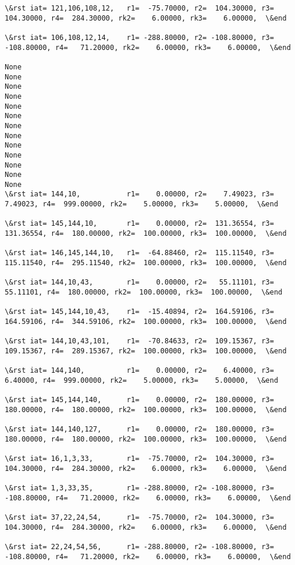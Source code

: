 \documentclass[11pt]{article}
\begin{document}
\begin{Verbatim}[commandchars=\\\{\}]
\&rst iat= 121,106,108,12,   r1=  -75.70000, r2=  104.30000, r3=  104.30000, r4=  284.30000, rk2=    6.00000, rk3=    6.00000,  \&end

\&rst iat= 106,108,12,14,    r1= -288.80000, r2= -108.80000, r3= -108.80000, r4=   71.20000, rk2=    6.00000, rk3=    6.00000,  \&end

None
None
None
None
None
None
None
None
None
None
None
None
None
\&rst iat= 144,10,           r1=    0.00000, r2=    7.49023, r3=    7.49023, r4=  999.00000, rk2=    5.00000, rk3=    5.00000,  \&end

\&rst iat= 145,144,10,       r1=    0.00000, r2=  131.36554, r3=  131.36554, r4=  180.00000, rk2=  100.00000, rk3=  100.00000,  \&end

\&rst iat= 146,145,144,10,   r1=  -64.88460, r2=  115.11540, r3=  115.11540, r4=  295.11540, rk2=  100.00000, rk3=  100.00000,  \&end

\&rst iat= 144,10,43,        r1=    0.00000, r2=   55.11101, r3=   55.11101, r4=  180.00000, rk2=  100.00000, rk3=  100.00000,  \&end

\&rst iat= 145,144,10,43,    r1=  -15.40894, r2=  164.59106, r3=  164.59106, r4=  344.59106, rk2=  100.00000, rk3=  100.00000,  \&end

\&rst iat= 144,10,43,101,    r1=  -70.84633, r2=  109.15367, r3=  109.15367, r4=  289.15367, rk2=  100.00000, rk3=  100.00000,  \&end

\&rst iat= 144,140,          r1=    0.00000, r2=    6.40000, r3=    6.40000, r4=  999.00000, rk2=    5.00000, rk3=    5.00000,  \&end

\&rst iat= 145,144,140,      r1=    0.00000, r2=  180.00000, r3=  180.00000, r4=  180.00000, rk2=  100.00000, rk3=  100.00000,  \&end

\&rst iat= 144,140,127,      r1=    0.00000, r2=  180.00000, r3=  180.00000, r4=  180.00000, rk2=  100.00000, rk3=  100.00000,  \&end

\&rst iat= 16,1,3,33,        r1=  -75.70000, r2=  104.30000, r3=  104.30000, r4=  284.30000, rk2=    6.00000, rk3=    6.00000,  \&end

\&rst iat= 1,3,33,35,        r1= -288.80000, r2= -108.80000, r3= -108.80000, r4=   71.20000, rk2=    6.00000, rk3=    6.00000,  \&end

\&rst iat= 37,22,24,54,      r1=  -75.70000, r2=  104.30000, r3=  104.30000, r4=  284.30000, rk2=    6.00000, rk3=    6.00000,  \&end

\&rst iat= 22,24,54,56,      r1= -288.80000, r2= -108.80000, r3= -108.80000, r4=   71.20000, rk2=    6.00000, rk3=    6.00000,  \&end


\end{Verbatim}
\end{document}
